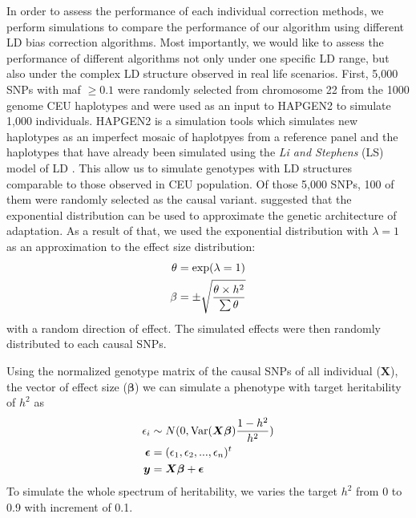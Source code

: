 		In order to assess the performance of each individual correction methods, we perform simulations to compare the performance of our algorithm using different \gls{LD} bias correction algorithms.
		Most importantly, we would like to assess the performance of different algorithms not only under one specific \gls{LD} range, but also under the complex \gls{LD} structure observed in real life scenarios.
		First, 5,000 \glspl{SNP} with \gls{maf} $\ge0.1$ were randomly selected from chromosome 22 from the 1000 genome \gls{CEU} haplotypes and were used as an input to HAPGEN2 \citep{Su2011} to simulate 1,000 individuals.
		HAPGEN2 is a simulation tools which simulates new haplotypes as an imperfect mosaic of haplotpyes from a reference panel and the haplotypes that have already been simulated using the \textit{Li and Stephens} (LS) model of \gls{LD} \citep{Li2003}.
		This allow us to simulate genotypes with \gls{LD} structures comparable to those observed in \gls{CEU} population. 
		Of those 5,000 \glspl{SNP}, 100 of them were randomly selected as the causal variant. 
		\citet{Orr1998} suggested that the exponential distribution can be used to approximate the genetic architecture of adaptation. 
		As a result of that, we used the exponential distribution with $\lambda=1$ as an approximation to the effect size distribution:
		\begin{align}
		\theta&=\mathrm{exp}(\lambda=1)\notag\\
		\beta&=\pm\sqrt{\frac{\theta \times h^2}{\sum \theta}}
		\label{eq:randomEffect}
		\end{align}
		with a random direction of effect.
		The simulated effects were then randomly distributed to each causal \glspl{SNP}.
			
		Using the normalized genotype matrix of the causal \glspl{SNP} of all individual ($\boldsymbol{X}$), the vector of effect size ($\boldsymbol{\beta}$) we can simulate a phenotype with target heritability of $h^2$ as
		\begin{align}
		\epsilon_i&\sim N(0,\mathrm{Var}(\boldsymbol{X\beta})\frac{1-h^2}{h^2} )\notag\\
		\boldsymbol{\epsilon} &= (\epsilon_1,\epsilon_2,...,\epsilon_n)^t\notag\\
		\boldsymbol{y} &= \boldsymbol{X\beta}+\boldsymbol{\epsilon}
		\label{eq:simulationOfPhenotype}
		\end{align}
		To simulate the whole spectrum of heritability, we varies the target $h^2$ from 0 to 0.9 with increment of 0.1.
		
